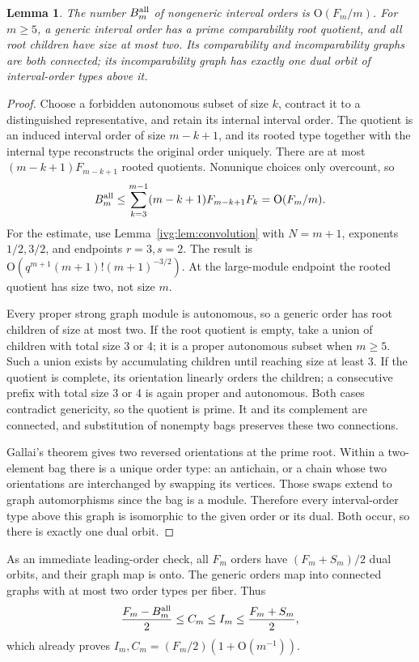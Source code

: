 \documentclass[11pt,letterpaper]{article}
\newtheorem{lemma}[theorem]{Lemma}
\theoremstyle{definition}\newtheorem{definition}[theorem]{Definition}
\theoremstyle{remark}\newtheorem{remark}[theorem]{Remark}
\newcommand{\OO}{\mathrm O}
\begin{document}
\begin{lemma}\label{ivg:lem:generic}
The number $B_m^{\rm all}$ of nongeneric interval orders is $\OO(F_m/m)$. For $m\ge5$, a generic interval order has a prime comparability root quotient, and all root children have size at most two. Its comparability and incomparability graphs are both connected; its incomparability graph has exactly one dual orbit of interval-order types above it.
\end{lemma}
\begin{proof}
Choose a forbidden autonomous subset of size $k$, contract it to a distinguished representative, and retain its internal interval order. The quotient is an induced interval order of size $m-k+1$, and its rooted type together with the internal type reconstructs the original order uniquely. There are at most $(m-k+1)F_{m-k+1}$ rooted quotients. Nonunique choices only overcount, so
\begin{equation}\label{ivg:eq:bad}
 B_m^{\rm all}\le\sum_{k=3}^{m-1}(m-k+1)F_{m-k+1}F_k
 =\OO(F_m/m).
\end{equation}
For the estimate, use Lemma~\ref{ivg:lem:convolution} with $N=m+1$, exponents $1/2,3/2$, and endpoints $r=3,s=2$. The result is $\OO(q^{m+1}(m+1)!(m+1)^{-3/2})$. At the large-module endpoint the rooted quotient has size two, not size $m$.

Every proper strong graph module is autonomous, so a generic order has root children of size at most two. If the root quotient is empty, take a union of children with total size 3 or 4; it is a proper autonomous subset when $m\ge5$. Such a union exists by accumulating children until reaching size at least 3. If the quotient is complete, its orientation linearly orders the children; a consecutive prefix with total size 3 or 4 is again proper and autonomous. Both cases contradict genericity, so the quotient is prime. It and its complement are connected, and substitution of nonempty bags preserves these two connections.

Gallai's theorem gives two reversed orientations at the prime root. Within a two-element bag there is a unique order type: an antichain, or a chain whose two orientations are interchanged by swapping its vertices. Those swaps extend to graph automorphisms since the bag is a module. Therefore every interval-order type above this graph is isomorphic to the given order or its dual. Both occur, so there is exactly one dual orbit.
\end{proof}
As an immediate leading-order check, all $F_m$ orders have $(F_m+S_m)/2$ dual orbits, and their graph map is onto. The generic orders map into connected graphs with at most two order types per fiber. Thus
\[
 \frac{F_m-B_m^{\rm all}}2\le C_m\le I_m\le\frac{F_m+S_m}2,
\]
which already proves $I_m,C_m=(F_m/2)(1+\OO(m^{-1}))$.
\end{document}
